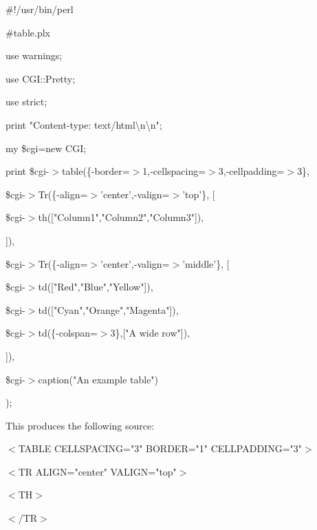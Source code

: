 \documentclass[a4paper,11pt]{book}
\begin{document}
\noindent 

\noindent 

\noindent \#!/usr/bin/perl

\noindent \#table.plx

\noindent use warnings;

\noindent use CGI::Pretty;

\noindent use strict;

\noindent print "Content-type: text/html\textbackslash n\textbackslash n";

\noindent my \$cgi=new CGI;

\noindent 

\noindent print \$cgi-$>$table(\{-border=$>$1,-cellspacing=$>$3,-cellpadding=$>$3\},

\noindent \$cgi-$>$Tr(\{-align=$>$'center',-valign=$>$'top'\}, [

\noindent \$cgi-$>$th(["Column1","Column2","Column3"]),

\noindent ]),

\noindent \$cgi-$>$Tr(\{-align=$>$'center',-valign=$>$'middle'\}, [

\noindent \$cgi-$>$td(["Red","Blue","Yellow"]),

\noindent \$cgi-$>$td(["Cyan","Orange","Magenta"]),

\noindent \$cgi-$>$td(\{-colspan=$>$3\},["A wide row"]),

\noindent ]),

\noindent \$cgi-$>$caption("An example table")

\noindent );

\noindent 

\noindent 

\noindent This produces the following source:

\noindent 

\noindent $<$TABLE CELLSPACING="3" BORDER="1" CELLPADDING="3"$>$

\noindent $<$TR ALIGN="center" VALIGN="top"$>$

\noindent $<$TH$>$

\noindent 

\noindent 

\noindent 

\noindent 

\noindent 

\noindent 

\noindent 

\noindent $<$/TR$>$

\noindent 
\end{document}
